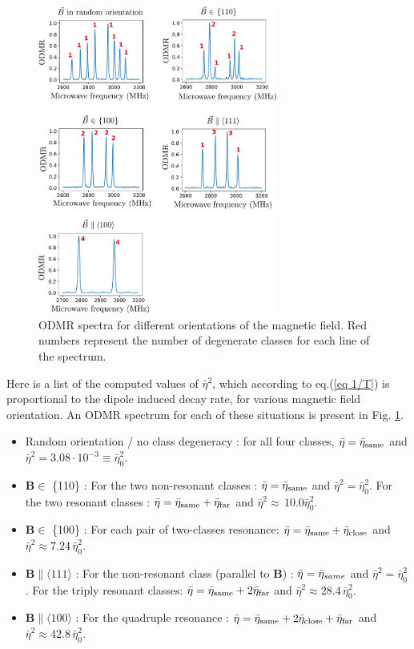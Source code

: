 \documentclass[preprintnumbers,amsmath,amssymb,onecolumn,12pt]{revtex4-2}\usepackage{graphicx}%
\begin{document}
\begin{figure}
\includegraphics[width=0.7\textwidth]{Figures_SI/Various_ESR}
\caption{ODMR spectra for different orientations of the magnetic field. Red numbers represent the number of degenerate classes for each line of the spectrum.}
\label{Various ODMR}
\end{figure}

Here is a list of the computed values of $\bar \eta^2$, which according to eq.(\ref{eq 1/T}) is proportional to the dipole induced decay rate, for various magnetic field orientation. An ODMR spectrum for each of these situations is present in Fig. \ref{Various ODMR}.
\begin{itemize}
\item Random orientation / no class degeneracy : for all four classes, $\bar \eta = \bar {\eta}_{\rm same}$ and $\bar \eta^2=3.08 \cdot 10^{-3} \equiv \bar \eta_0^2$.
\item $\bm{B} \in$ \{110\} : For the two non-resonant classes : $\bar \eta = \bar {\eta}_{\rm same}$ and $\bar \eta^2= \bar \eta_0^2$.  For the two resonant classes : $\bar \eta = \bar {\eta}_{\rm same} + \bar {\eta}_{\rm far}$ and $\bar \eta^2\approx\, 10.0 \bar \eta_0^2$.
\item $\bm{B} \in$ \{100\} : For each pair of two-classes resonance: $\bar \eta = \bar {\eta}_{\rm same}+\bar {\eta}_{\rm close}$ and $\bar \eta^2\approx 7.24\, \bar \eta_0^2$. 
\item $\bm{B} \parallel \langle 111 \rangle$ : For the non-resonant class (parallel to $\bm B$) : $\bar \eta = \bar {\rm \eta}_{same}$ and $\bar \eta^2= \bar \eta_0^2$. For the triply resonant classes: $\bar \eta = \bar {\eta}_{\rm same}+2\bar {\eta}_{\rm far}$ and $\bar \eta^2\approx 28.4\, \bar \eta_0^2$. 
\item $\bm{B} \parallel \langle 100 \rangle$ : For the quadruple resonance : $\bar \eta = \bar {\eta}_{\rm same}+2\bar {\eta}_{\rm close} + \bar {\eta}_{\rm far}$  and $\bar \eta^2\approx 42.8\, \bar \eta_0^2$.
\end{itemize}
\end{document}
